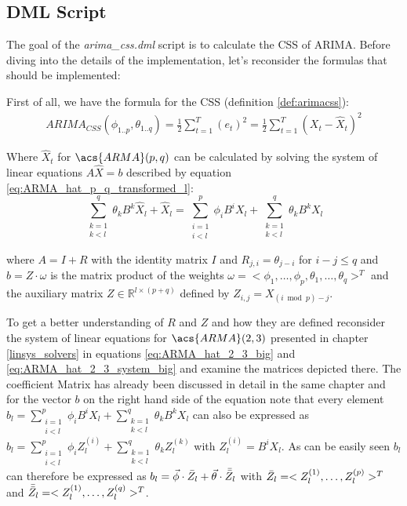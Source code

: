 \subsection*{DML Script}

The goal of the \textit{arima\_css.dml} script is to calculate the \acl{CSS} of \acs{ARIMA}. Before diving into the details of the implementation, let's reconsider the formulas that should be implemented: 

First of all, we have the formula for the \acl{CSS} (definition \ref{def:arimacss}):
\begin{equation*}
    \begin{array}{rcl}
        ARIMA_{CSS}(\phi_{1..p}, \theta_{1..q}) = \frac{1}{2}\displaystyle\sum_{t=1}^{T} (e_t)^2 = \frac{1}{2}\displaystyle\sum_{t=1}^{T} (X_t - \hat{X}_t)^2
    \end{array}
\end{equation*}

Where $\hat{X}_t$ for $\acs{ARMA}(p,q)$ can be calculated by solving the system of linear equations $A \hat{X} = b$ described by equation \ref{eq:ARMA_hat_p_q_transformed_l}:
\begin{equation*}
    \displaystyle\sum_{\substack{k=1 \\ k < l}}^{q} \theta_k B^k \hat{X}_{l} + \hat{X}_{l} = \displaystyle\sum_{\substack{i=1 \\ i < l}}^{p} \phi_i B^i X_{l} +\displaystyle\sum_{\substack{k=1 \\ k < l}}^{q} \theta_k B^k X_{l}
\end{equation*}

where $A = I + R $ with the identity matrix $I$ and $R_{j,i} = \theta_{j-i}$ for $i-j \leq q$ and $b = Z \cdot \omega $ is the matrix product of the weights $\omega = <\phi_1, \dots, \phi_p, \theta_1, \dots, \theta_q>^T$ and the auxiliary matrix $Z \in \mathbb{R}^{l \times (p+q)}$ defined by $Z_{i,j}=X_{(i \bmod p)-j}$. 

To get a better understanding of $R$ and $Z$ and how they are defined reconsider the system of linear equations for $\acs{ARMA}(2,3)$ presented in chapter \ref{linsys_solvers} in equations \ref{eq:ARMA_hat_2_3_big} and \ref{eq:ARMA_hat_2_3_system_big} and examine the matrices depicted there. The coefficient Matrix has already been discussed in detail in the same chapter and for the vector $b$ on the right hand side of the equation note that every element $b_l = \sum_{\substack{i=1 \\ i < l}}^{p} \phi_i B^i X_{l} +\sum_{\substack{k=1 \\ k < l}}^{q} \theta_k B^k X_{l}$ can also be expressed as $b_l = \sum_{\substack{i=1 \\ i < l}}^{p} \phi_i Z_{l}^{(i)} +\sum_{\substack{k=1 \\ k < l}}^{q} \theta_k Z_{l}^{(k)}$ with $Z_{l}^{(i)} = B^i X_{l}$. As can be easily seen $b_l$ can therefore be expressed as $b_l = \Vec{\phi} \cdot \Bar{Z}_l + \Vec{\theta} \cdot \Bar{\Bar{Z}}_l$ with $\Bar{Z}_l = <Z_{l}^{(1)}, \dots, Z_{l}^{(p)}>^T$ and $\Bar{\Bar{Z}}_l = <Z_{l}^{(1)}, \dots, Z_{l}^{(q)}>^T$.

